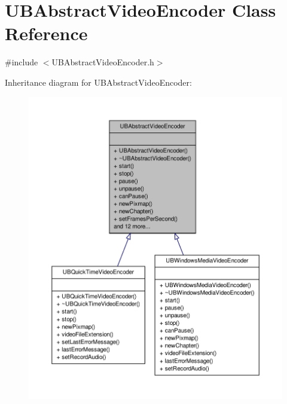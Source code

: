 \hypertarget{class_u_b_abstract_video_encoder}{\section{U\-B\-Abstract\-Video\-Encoder Class Reference}
\label{d2/da1/class_u_b_abstract_video_encoder}
}


{\ttfamily \#include $<$U\-B\-Abstract\-Video\-Encoder.\-h$>$}



Inheritance diagram for U\-B\-Abstract\-Video\-Encoder\-:
\nopagebreak
\begin{figure}[H]
\begin{center}
\leavevmode
\includegraphics[width=350pt]{dc/daa/class_u_b_abstract_video_encoder__inherit__graph}
\end{center}
\end{figure}


